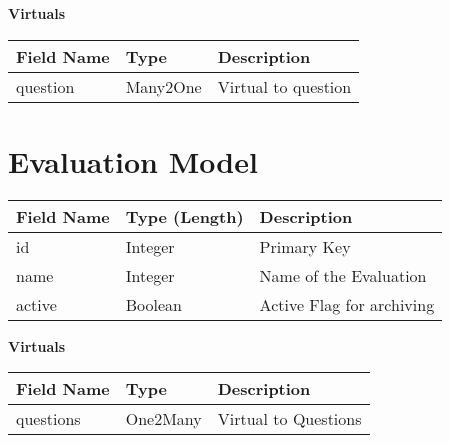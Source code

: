 \documentclass[letterpaper,10pt,english]{sphinxmanual}
\begin{document}
\textbf{Virtuals}

\begin{tabulary}{\linewidth}{|L|L|L|}
\hline
\textsf{\relax 
Field Name
} & \textsf{\relax 
Type
} & \textsf{\relax 
Description
}\\
\hline
question
 & 
Many2One
 & 
Virtual to question
\\
\hline\end{tabulary}



\section{Evaluation Model}
\label{dev-models:evaluation-model-label}\label{dev-models:evaluation-model}
\begin{tabulary}{\linewidth}{|L|L|L|}
\hline
\textsf{\relax 
Field Name
} & \textsf{\relax 
Type (Length)
} & \textsf{\relax 
Description
}\\
\hline
id
 & 
Integer
 & 
Primary Key
\\

name
 & 
Integer
 & 
Name of the Evaluation
\\

active
 & 
Boolean
 & 
Active Flag for archiving
\\
\hline\end{tabulary}


\textbf{Virtuals}

\begin{tabulary}{\linewidth}{|L|L|L|}
\hline
\textsf{\relax 
Field Name
} & \textsf{\relax 
Type
} & \textsf{\relax 
Description
}\\
\hline
questions
 & 
One2Many
 & 
Virtual to Questions
\\
\hline\end{tabulary}
\end{document}
